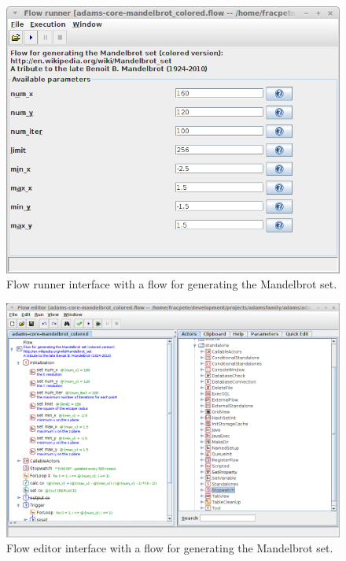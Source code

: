 \begin{figure}[htb]
  \centering
  \includegraphics[width=12.0cm]{images/flowrunner-mandelbrot.png}
  \caption{Flow runner interface with a flow for generating the Mandelbrot set.}
  \label{flowrunner-mandelbrot}
\end{figure}

\begin{figure}[htb]
  \centering
  \includegraphics[width=12.0cm]{images/floweditor-mandelbrot.png}
  \caption{Flow editor interface with a flow for generating the Mandelbrot set.}
  \label{floweditor-mandelbrot}
\end{figure}


